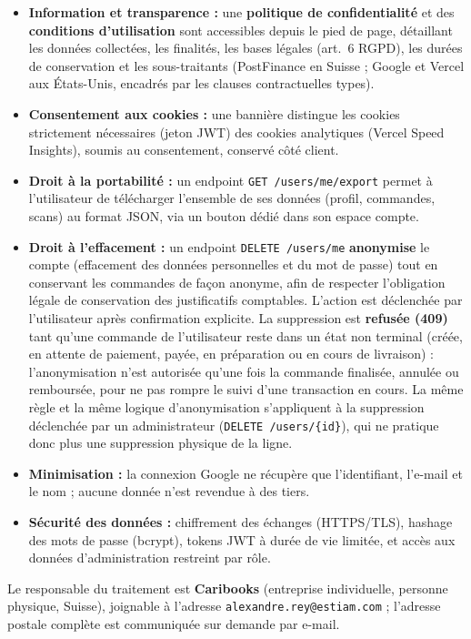 \documentclass[12pt, a4paper]{report}
\renewcommand{\_}{\origunderscore\allowbreak}
\begin{document}
\begin{itemize}
    \item \textbf{Information et transparence :} une \textbf{politique de confidentialité} et des \textbf{conditions d'utilisation} sont accessibles depuis le pied de page, détaillant les données collectées, les finalités, les bases légales (art.~6 RGPD), les durées de conservation et les sous-traitants (PostFinance en Suisse ; Google et Vercel aux États-Unis, encadrés par les clauses contractuelles types).
    \item \textbf{Consentement aux cookies :} une bannière distingue les cookies strictement nécessaires (jeton JWT) des cookies analytiques (Vercel Speed Insights), soumis au consentement, conservé côté client.
    \item \textbf{Droit à la portabilité :} un endpoint \texttt{GET /users/me/export} permet à l'utilisateur de télécharger l'ensemble de ses données (profil, commandes, scans) au format JSON, via un bouton dédié dans son espace compte.
    \item \textbf{Droit à l'effacement :} un endpoint \texttt{DELETE /users/me} \textbf{anonymise} le compte (effacement des données personnelles et du mot de passe) tout en conservant les commandes de façon anonyme, afin de respecter l'obligation légale de conservation des justificatifs comptables. L'action est déclenchée par l'utilisateur après confirmation explicite. La suppression est \textbf{refusée (409)} tant qu'une commande de l'utilisateur reste dans un état non terminal (créée, en attente de paiement, payée, en préparation ou en cours de livraison) : l'anonymisation n'est autorisée qu'une fois la commande finalisée, annulée ou remboursée, pour ne pas rompre le suivi d'une transaction en cours. La même règle et la même logique d'anonymisation s'appliquent à la suppression déclenchée par un administrateur (\texttt{DELETE /users/\{id\}}), qui ne pratique donc plus une suppression physique de la ligne.
    \item \textbf{Minimisation :} la connexion Google ne récupère que l'identifiant, l'e-mail et le nom ; aucune donnée n'est revendue à des tiers.
    \item \textbf{Sécurité des données :} chiffrement des échanges (HTTPS/TLS), hashage des mots de passe (bcrypt), tokens JWT à durée de vie limitée, et accès aux données d'administration restreint par rôle.
\end{itemize}

\noindent Le responsable du traitement est \textbf{Caribooks} (entreprise individuelle, personne physique, Suisse), joignable à l'adresse \texttt{alexandre.rey@estiam.com} ; l'adresse postale complète est communiquée sur demande par e-mail.
\end{document}
